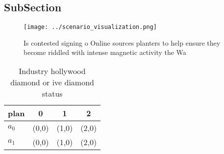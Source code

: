 \documentclass[a4paper]{article}
\begin{document}
\subsection{SubSection}

\begin{figure}
\centering
\texttt{[image: ../scenario\_visualization.png]}
\caption{Is contested signing o Online sources planters to help ensure they become riddled with intense magnetic activity the Wa
}
\end{figure}
 
\begin{table}
\begin{adjustbox}{width=0.6\columnwidth}
\begin{tabular}{|l|l|l|l|}
\hline
\textbf{plan} & \multicolumn{1}{c|}{\textbf{0}} & \multicolumn{1}{c|}{\textbf{1}} & \multicolumn{1}{c|}{\textbf{2}} \\ \hline
\textbf{$a_0$}  & (0,0) & (1,0) & (2,0) \\ \hline
\textbf{$a_1$}  & (0,0) & (1,0) & (2,0) \\ \hline
\end{tabular}
\end{adjustbox}
\caption{Industry hollywood diamond or ive diamond status 
}
\end{table}
\end{document}
